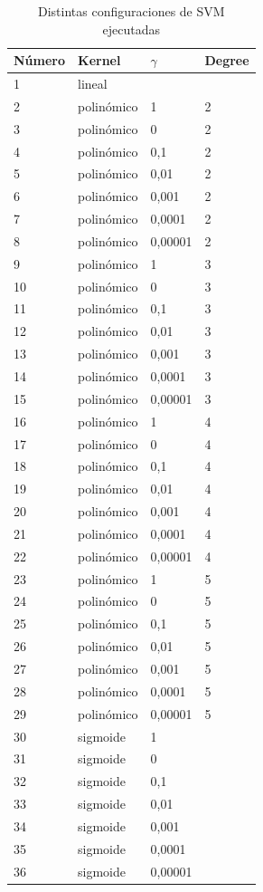 \documentclass[journal]{IEEEtran}
\begin{document}
\begin{table}[ht!]
\caption{Distintas configuraciones de SVM ejecutadas}
\label{table:svm_config}
\centering
\begin{tabular}{l | l l l }
Número & Kernel & $\gamma$ & Degree  \\
\hline
1 & lineal &  &  \\ 
2 & polinómico & 1  & 2 \\ 
3  & polinómico & 0  & 2 \\ 
4  & polinómico & 0,1  & 2 \\ 
5  & polinómico & 0,01  & 2 \\ 
6  & polinómico & 0,001  & 2 \\ 
7  & polinómico & 0,0001  & 2 \\ 
8  & polinómico & 0,00001  & 2 \\ 
9  & polinómico & 1  & 3 \\ 
10 & polinómico & 0  & 3 \\ 
11 & polinómico & 0,1  & 3 \\ 
12 & polinómico & 0,01  & 3 \\ 
13 & polinómico & 0,001  & 3 \\ 
14 & polinómico & 0,0001  & 3 \\ 
15 & polinómico & 0,00001  & 3 \\ 
16 & polinómico & 1  & 4 \\ 
17 & polinómico & 0  & 4 \\ 
18 & polinómico & 0,1  & 4 \\ 
19 & polinómico & 0,01  & 4 \\ 
20 & polinómico & 0,001  & 4 \\ 
21 & polinómico & 0,0001  & 4 \\ 
22 & polinómico & 0,00001  & 4 \\ 
23 & polinómico & 1  & 5 \\ 
24 & polinómico & 0  & 5 \\ 
25 & polinómico & 0,1  & 5 \\ 
26 & polinómico & 0,01  & 5 \\ 
27 & polinómico & 0,001  & 5 \\ 
28 & polinómico & 0,0001  & 5 \\ 
29 & polinómico & 0,00001  & 5 \\ 
30 & sigmoide & 1 &  \\ 
31 & sigmoide & 0 &  \\ 
32 & sigmoide & 0,1 &  \\ 
33 & sigmoide & 0,01 &  \\ 
34 & sigmoide & 0,001 &  \\ 
35 & sigmoide & 0,0001 &  \\ 
36 & sigmoide & 0,00001 &  \\ 
\end{tabular}
\end{table}
\end{document}
